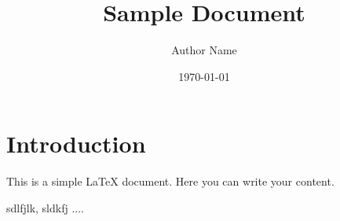 \documentclass{article}
\title{Sample Document}
\author{Author Name}
\date{\today}
\begin{document}
\maketitle

\section{Introduction}
This is a simple LaTeX document. Here you can write your content.

sdlfjlk, sldkfj ....
\end{document}
